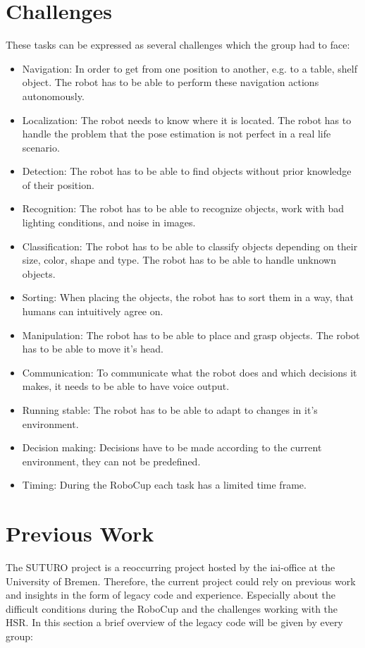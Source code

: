 \documentclass[main.tex]{subfiles}
\begin{document}
	\section{Challenges}
	\label{challanges}
	These tasks can be expressed as several challenges which the group had to face:
	\begin{itemize}
		\item Navigation: In order to get from one position to another, e.g. to a table, shelf object. The robot has to be able to perform these navigation actions autonomously.
		\item Localization: The robot needs to know where it is located. The robot has to handle the problem that the pose estimation is not perfect in a real life scenario.
		\item Detection: The robot has to be able to find objects without prior knowledge of their position.
		\item Recognition: The robot has to be able to recognize objects, work with bad lighting conditions, and noise in images.
		\item Classification: The robot has to be able to classify objects depending on their size, color, shape and type. The robot has to be able to handle unknown objects.
		\item Sorting: When placing the objects, the robot has to sort them in a way, that humans can intuitively agree on.
		\item Manipulation: The robot has to be able to place and grasp objects. The robot has to be able to move it's head.
		\item Communication: To communicate what the robot does and which decisions it makes, it needs to be able to have voice output.
		\item Running stable: The robot has to be able to adapt to changes in it's environment.
		\item Decision making: Decisions have to be made according to the current environment, they can not be predefined. 
		\item Timing: During the RoboCup each task has a limited time frame.
	\end{itemize}

	\section{Previous Work}
		The SUTURO project is a reoccurring project hosted by the iai-office at the University of Bremen. Therefore, the current project could rely on previous work and insights in the form of legacy code and experience. Especially about the difficult conditions during the RoboCup and the challenges working with the HSR. In this section a brief overview of the legacy code will be given by every group:
\end{document}
